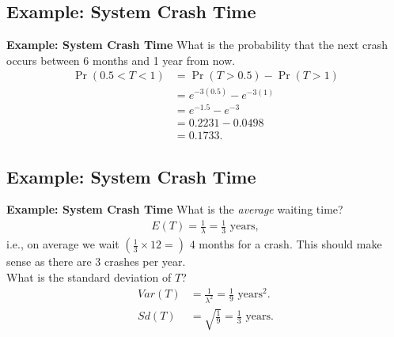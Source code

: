 \documentclass[compress]{beamer}        %
\makeatletter
\newcommand{\tcb}{\textcolor{beamer@blendedblue}}
\makeatother
\begin{document}
\subsection{Example: System Crash Time}
\begin{frame}{\bf \tcb{Example: System Crash Time}}\label{expexampletab}
What is the probability that the next crash occurs between 6 months and 1 year from now.\\[-0.4cm]
\begin{align*}
\Pr(0.5<T<1) &= \Pr(T>0.5) - \Pr(T>1) \\[0.2cm]
&= e^{-3(0.5)} - e^{-3(1)}\\[0.2cm]
&= e^{-1.5} - e^{-3}\\[0.2cm]
&= 0.2231 - 0.0498 \\[0.2cm]
&= 0.1733.
\end{align*}

\end{frame}




\subsection{Example: System Crash Time}
\begin{frame}{\bf \tcb{Example: System Crash Time}}
What is the \emph{average} waiting time?\\[-0.4cm]
\begin{align*}
E(T) = \frac{1}{\lambda} = \frac{1}{3} \text{ years},
\end{align*}
i.e.,  on average we wait $(\frac{1}{3}\times12 =)\,\, 4$ months for a crash. This should make sense as there are 3 crashes per year.\\[0.5cm]

What is the standard deviation of $T$?\\[-0.6cm]
\begin{align*}
Var(T) &= \frac{1}{\lambda^2} = \frac{1}{9} \text{ years$^2$}.\\[0.4cm]
Sd(T) &= \sqrt{\frac{1}{9}} = \frac{1}{3} \text{ years}.
\end{align*}


\end{frame}
\end{document}
